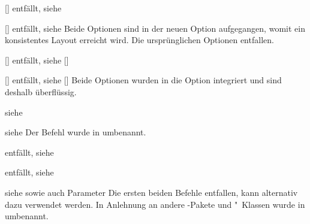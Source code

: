 \begin{Declaration}{[\PBoolean]}{%
  entfällt, siehe %
}
\begin{Declaration}{[\PBoolean]}{%
  entfällt, siehe %
}
\printdeclarationlist*%
%
Beide Optionen sind in der neuen Option  
aufgegangen, womit ein konsistentes Layout erreicht wird. Die ursprünglichen 
Optionen entfallen. 
\end{Declaration}
\end{Declaration}

\begin{Declaration}{[\PBoolean]}{%
  entfällt, siehe [\PSet]%
}
\begin{Declaration}{[\PBoolean]}{%
  entfällt, siehe [\PSet]%
}
\printdeclarationlist*%
%
Beide Optionen wurden in die Option  integriert und sind 
deshalb überflüssig.
\end{Declaration}
\end{Declaration}

\begin{Declaration}{}%
  {siehe %
}
\begin{Declaration}{}%
  {siehe %
}
\printdeclarationlist*%
%
Der Befehl  wurde in  umbenannt.
\end{Declaration}
\end{Declaration}

\begin{Declaration}{}{%
  entfällt, siehe %
}
\begin{Declaration}{}{%
  entfällt, siehe %
}
\begin{Declaration}{}{%
  siehe  sowie auch Parameter %
}
\printdeclarationlist*%
%
Die ersten beiden Befehle entfallen,  kann alternativ dazu 
verwendet werden. In Anlehnung an andere -Pakete und "~Klassen 
wurde  in  umbenannt.
\end{Declaration}
\end{Declaration}
\end{Declaration}

